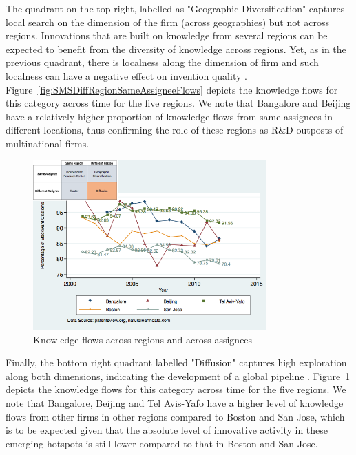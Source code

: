 \documentclass[parskip=full,11pt,letterpaper]{article}
\begin{document}
The quadrant on the top right, labelled as "Geographic Diversification" captures local search on the dimension of the firm (across geographies) but not across regions. Innovations that are built on knowledge from several regions can be expected to benefit from the diversity of knowledge across regions. Yet, as in the previous quadrant, there is localness along the dimension of firm and such localness can have a negative effect on invention quality \citep{Rosenkopf2001}. Figure~\ref{fig:SMSDiffRegionSameAssigneeFlows} depicts the  knowledge flows for this category across time for the five regions. We note that Bangalore and Beijing have a relatively higher proportion of knowledge flows from same assignees in different locations, thus confirming the role of these regions as R\&D outposts of multinational firms.\par

\begin{figure}[h!]
\begin{centering}
  \includegraphics[width=0.80\textwidth]{SMSDiffRegionDiffAssigneeFlows}
  \caption{Knowledge flows across regions and across assignees}
  \label{fig:SMSDiffRegionDiffAssigneeFlows}
\end{centering}
\end{figure}

Finally, the bottom right quadrant labelled "Diffusion" captures high exploration along both dimensions, indicating the development of a global pipeline \citep*{Bathelt2004}. Figure~\ref{fig:SMSDiffRegionDiffAssigneeFlows} depicts the  knowledge flows for this category across time for the five regions. We note that Bangalore, Beijing and Tel Avis-Yafo have a higher level of knowledge flows from other firms in other regions compared to Boston and San Jose, which is to be expected given that the absolute level of innovative activity in these emerging hotspots is still lower compared to that in Boston and San Jose. \par
\end{document}
